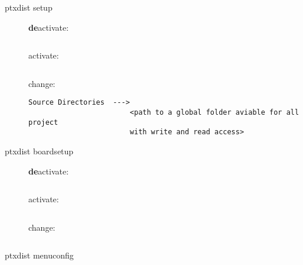 \begin{description}


	\item[ptxdist setup]

		\begin{itemize} \textbf{de}activate:
		        \begin{lstlisting}[caption={}]

				\end{lstlisting}
		\end{itemize}

		\begin{itemize} activate:
		        \begin{lstlisting}[caption={}]

				\end{lstlisting}
		\end{itemize}

		\begin{itemize} change:
		        \begin{lstlisting}[caption={}]
 					Source Directories  --->
						<path to a global folder aviable for all project
						with write and read access>

				\end{lstlisting}
		\end{itemize}


	\item[ptxdist boardsetup]

		\begin{itemize} \textbf{de}activate:
		        \begin{lstlisting}[caption={}]

				\end{lstlisting}
		\end{itemize}

		\begin{itemize} activate:
		        \begin{lstlisting}[caption={}]

				\end{lstlisting}
		\end{itemize}

		\begin{itemize} change:
		        \begin{lstlisting}[caption={}]

				\end{lstlisting}
		\end{itemize}


    \item[ptxdist menuconfig]


\end{description}

